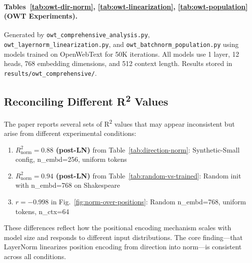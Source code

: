 \documentclass[11pt]{article}
\begin{document}
\paragraph{Tables~\ref{tab:owt-dir-norm}, \ref{tab:owt-linearization}, \ref{tab:owt-population} (OWT Experiments).}
Generated by \texttt{owt\_comprehensive\_analysis.py}, \texttt{owt\_layernorm\_linearization.py}, and \texttt{owt\_batchnorm\_population.py} using models trained on OpenWebText for 50K iterations. All models use 1 layer, 12 heads, 768 embedding dimensions, and 512 context length. Results stored in \texttt{results/owt\_comprehensive/}.

\subsection{Reconciling Different R\textsuperscript{2} Values}

The paper reports several sets of R\textsuperscript{2} values that may appear inconsistent but arise from different experimental conditions:

\begin{enumerate}
    \item \textbf{$R^2_{\text{norm}}=0.88$ (post-LN)} from Table~\ref{tab:direction-norm}: Synthetic-Small config, n\_embd=256, uniform tokens
    \item \textbf{$R^2_{\text{norm}}=0.94$ (post-LN)} from Table~\ref{tab:random-vs-trained}: Random init with n\_embd=768 on Shakespeare
    \item \textbf{$r=-0.998$} in Fig.~\ref{fig:norm-over-positions}: Random n\_embd=768, uniform tokens, n\_ctx=64
\end{enumerate}

These differences reflect how the positional encoding mechanism scales with model size and responds to different input distributions. The core finding---that LayerNorm linearizes position encoding from direction into norm---is consistent across all conditions.
\end{document}
